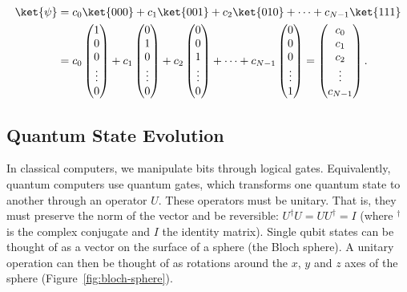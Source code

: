 \documentclass[a4paper,10pt]{article}
\begin{document}
\begin{equation}
\begin{aligned}
\ket{\psi} &= c_0\ket{000} + c_1\ket{001} + c_2\ket{010} + \dotsm + c_{N-1}\ket{111} \\
&= c_0\begin{pmatrix}1 \\ 0 \\ 0 \\ \vdots \\ 0\end{pmatrix} + c_1\begin{pmatrix}0 \\ 1 \\ 0 \\ \vdots \\ 0\end{pmatrix} + c_2\begin{pmatrix}0 \\ 0 \\ 1 \\ \vdots \\ 0\end{pmatrix} + \dotsm + c_{N-1}\begin{pmatrix}0 \\ 0 \\ 0 \\ \vdots \\ 1\end{pmatrix} = \begin{pmatrix}c_0 \\ c_1 \\ c_2 \\ \vdots \\ c_{N-1}\end{pmatrix}.
\end{aligned}
\end{equation}

\subsection{Quantum State Evolution}
In classical computers, we manipulate bits through logical gates.
Equivalently, quantum computers use quantum gates, which transforms one quantum state to another through an operator $U$.
These operators must be unitary.
That is, they must preserve the norm of the vector and be reversible: $U^\dagger U = UU^\dagger = I$ (where $^\dagger$ is the complex conjugate and $I$ the identity matrix).
Single qubit states can be thought of as a vector on the surface of a sphere (the Bloch sphere).
A unitary operation can then be thought of as rotations around the $x$, $y$ and $z$ axes of the sphere (Figure~\ref{fig:bloch-sphere}).
\end{document}
